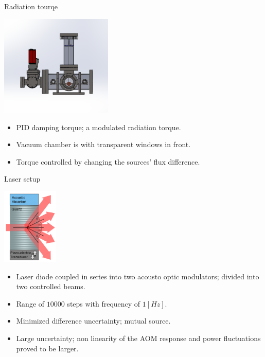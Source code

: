 \documentclass{beamer}
\begin{document}
\begin{frame}{\hypertarget{frame:Radiation tourqe}{Radiation tourqe}}
	\begin{center}		
		\includegraphics[width=0.4\textwidth,keepaspectratio]{total_chamber.png}
	\end{center}
	\begin{itemize}		
		\item PID damping torque; a modulated radiation torque.
		\item Vacuum chamber is with transparent windows in front.
		\item Torque controlled by changing the sources' flux difference.
		
	\end{itemize}
\end{frame}


\begin{frame}{Laser setup}
	\begin{center}		
		\includegraphics[width=0.2\textwidth,keepaspectratio]{aom.png}
	\end{center}
	\begin{itemize}		
		\item Laser diode coupled in series into two acousto optic modulators; divided into two controlled beams.
		\item Range of $10000$ steps with frequency of $1 [Hz]$.
		\item Minimized difference uncertainty; mutual source.
		\item Large uncertainty; non linearity of the AOM response and power fluctuations proved to be larger.
	\end{itemize}
\end{frame}
\end{document}

